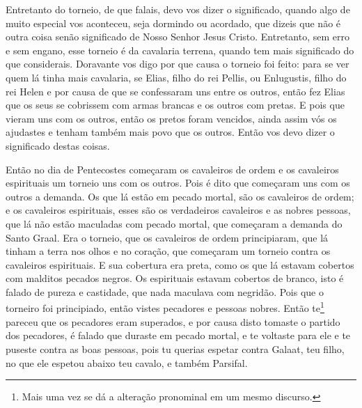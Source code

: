 Entretanto do torneio, de que falais, devo vos dizer o significado, quando algo
de  muito especial vos aconteceu, seja dormindo ou acordado, que dizeis que não
é outra coisa senão significado de Nosso Senhor Jesus Cristo. Entretanto, sem
erro e sem engano, esse torneio é da cavalaria terrena, quando tem mais
significado do que considerais. Doravante vos digo por que causa o torneio foi
feito: para se ver quem lá tinha mais cavalaria, se Elias, filho do rei Pellis,
ou Enlugustis, filho do rei Helen e por causa de que se confessaram uns entre
os outros, então fez Elias que os seus se cobrissem com armas brancas e os
outros com pretas. E pois que vieram uns com os outros, então os pretos foram
vencidos, ainda assim vós os ajudastes e tenham também mais povo que os outros.
Então vos devo dizer o significado destas coisas.

Então no dia de Pentecostes começaram os cavaleiros de ordem e os cavaleiros
espirituais um torneio uns com os outros. Pois é dito que começaram uns com os
outros a demanda. Os que lá estão em pecado mortal, são os cavaleiros de ordem;
e os cavaleiros espirituais, esses são os verdadeiros cavaleiros e as nobres
pessoas, que lá não estão maculadas com pecado mortal, que começaram a demanda
do Santo Graal. Era o torneio, que os cavaleiros de ordem principiaram, que lá
tinham a terra nos olhos e no coração, que começaram um torneio contra os
cavaleiros espirituais. E sua cobertura era preta, como os que lá estavam
cobertos com malditos pecados negros. Os espirituais estavam cobertos de
branco, isto é falado de pureza e castidade, que nada maculava com negridão.
Pois que o torneiro foi principiado, então vistes pecadores e pessoas nobres.
Então te\footnote{ Mais uma vez se dá a alteração pronominal em um mesmo
discurso.}  pareceu que os pecadores eram superados, e por causa
disto tomaste o partido dos pecadores, é falado que duraste em pecado mortal, e
te voltaste para ele e te puseste contra as boas pessoas, pois tu querias
espetar contra Galaat, teu filho, no que ele espetou abaixo teu cavalo, e
também Parsifal. 

